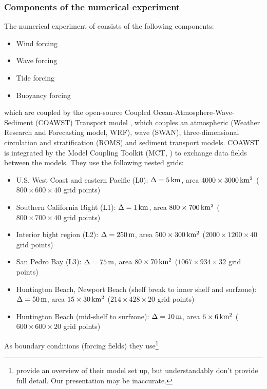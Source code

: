\documentclass[12pt,a4paper]{article}
\begin{document}
\subsubsection{Components of the numerical experiment}

The numerical experiment of \cite{kumar2015midshelf} consists of the following components:

\begin{itemize}
	\item Wind forcing
	\item Wave forcing
	\item Tide forcing
	\item Buoyancy forcing
\end{itemize}

which are coupled by the open-source Coupled Ocean-Atmosphere-Wave-Sediment (COAWST) Transport model \citep{warner2008using,web:coawst}, which couples an atmospheric (Weather Research and Forecasting model, WRF), wave (SWAN), three-dimensional circulation and stratification (ROMS) and sediment transport models. COAWST is integrated by the Model Coupling Toolkit (MCT, \citealt{web:mct}) to exchange data fields between the models. They use the following nested grids:

\begin{itemize}
	\item U.S. West Coast and eastern Pacific (L0):  $\Delta=5\,\rm km$, area $4000\times3000\,\rm km^2$ ($800\times600\times40$ grid points)
	\item Southern California Bight (L1):  $\Delta=1\,\rm km$, area $800\times700\,\rm km^2$ ($800\times700\times40$ grid points)
	\item Interior bight region (L2): $\Delta=250\,\rm m$, area $500\times300\,\rm km^2$ ($2000\times1200\times40$ grid points)
	\item San Pedro Bay (L3): $\Delta=75\,\rm m$, area $80\times70\,\rm km^2$ ($1067\times934\times32$ grid points)
	\item Huntington Beach, Newport Beach (shelf break to inner shelf and surfzone): $\Delta=50\,\rm m$, area $15\times30\,\rm km^2$ ($214\times428\times20$ grid points)
	\item Huntington Beach (mid-shelf to surfzone): $\Delta=10\,\rm m$, area $6\times6\,\rm km^2$ ($600\times600\times20$ grid points)
\end{itemize}

 As boundary conditions (forcing fields) they use\footnote{\cite{kumar2015midshelf} provide an overview of their model set up, but understandably don't provide full detail. Our presentation may be inaccurate.}
\end{document}
